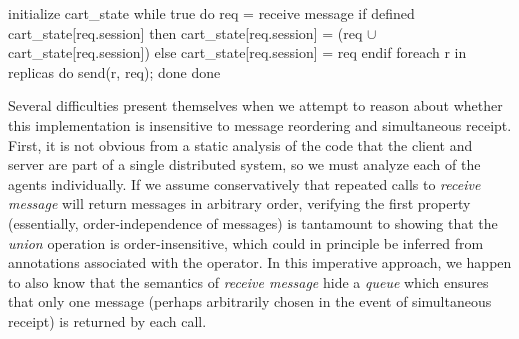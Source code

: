 




\begin{Dedalus}
initialize cart_state
while true do
  req = receive message
  if defined cart_state[req.session] then
     cart_state[req.session] =  
       (req \(\cup\) cart_state[req.session]) 
  else 
    cart_state[req.session] = { req } 
  endif
  foreach r in replicas do
    send(r, req);
  done
done
\end{Dedalus}

Several difficulties present themselves when we attempt to reason about whether
this implementation is insensitive to message reordering and simultaneous receipt.
First, it is not obvious from a static analysis of the code that the client and server are
part of a single distributed system, so we must analyze each of the agents individually.
If we assume conservatively that repeated calls to {\em receive message} will return messages in
arbitrary order, verifying the first property (essentially, order-independence of messages)
is tantamount to showing that the {\em union} operation is
order-insensitive, which could in principle be inferred from annotations associated
with the operator.
In this imperative approach, we happen to also know that the semantics of {\em receive message}
hide a {\em queue} which ensures that only one message (perhaps arbitrarily chosen in the
event of simultaneous receipt) is returned by each call.


